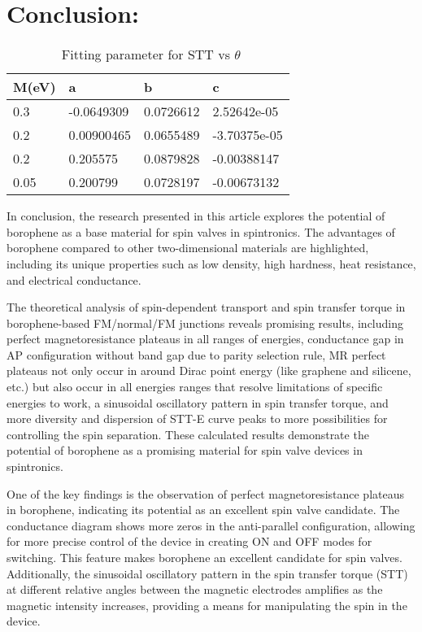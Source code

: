 \documentclass[twoside,twocolumn,9pt]{article}
\begin{document}
\section{Conclusion:}
\begin{table}[t]
\small
  \caption{\ Fitting parameter for STT vs $\theta$}
  \label{tbl:fitting}
  \begin{tabular*}{0.48\textwidth}{@{\extracolsep{\fill}}llll}
    \hline
    M(eV) & a & b & c \\
    \hline
    0.3 & -0.0649309 & 0.0726612 & 2.52642e-05 \\
    0.2 & 0.00900465 & 0.0655489 & -3.70375e-05 \\
    0.2 & 0.205575 & 0.0879828 & -0.00388147 \\
    0.05 & 0.200799 & 0.0728197 & -0.00673132 \\
    \hline
  \end{tabular*}
\end{table}
In conclusion, the research presented in this article explores the potential of borophene as a base material for spin valves in spintronics. The advantages of borophene compared to other two-dimensional materials are highlighted, including its unique properties such as low density, high hardness, heat resistance, and electrical conductance.

The theoretical analysis of spin-dependent transport and spin transfer torque in borophene-based FM/normal/FM junctions reveals promising results, including perfect magnetoresistance plateaus in all ranges of energies, conductance gap in AP configuration without band gap due to parity selection rule, MR perfect plateaus not only occur in around Dirac point energy (like graphene and silicene, etc.) but also occur in all energies ranges that resolve limitations of specific energies to work, a sinusoidal oscillatory pattern in spin transfer torque, and more diversity and dispersion of STT-E curve peaks to more possibilities for controlling the spin separation. These calculated results demonstrate the potential of borophene as a promising material for spin valve devices in spintronics.

One of the key findings is the observation of perfect magnetoresistance plateaus in borophene, indicating its potential as an excellent spin valve candidate. The conductance diagram shows more zeros in the anti-parallel configuration, allowing for more precise control of the device in creating ON and OFF modes for switching. This feature makes borophene an excellent candidate for spin valves. Additionally, the sinusoidal oscillatory pattern in the spin transfer torque (STT) at different relative angles between the magnetic electrodes amplifies as the magnetic intensity increases, providing a means for manipulating the spin in the device. 
\end{document}
